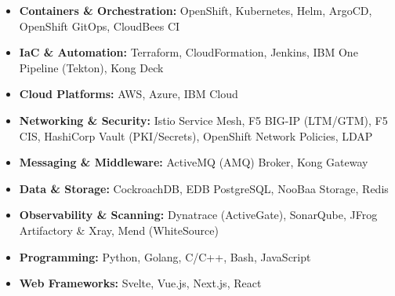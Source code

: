 \begin{itemize}[leftmargin=9pt,label=]
  \item \textbf{Containers \& Orchestration:}
    OpenShift, Kubernetes, Helm, ArgoCD, OpenShift GitOps, CloudBees CI
  \item \textbf{IaC \& Automation:}
    Terraform, CloudFormation, Jenkins, IBM One Pipeline (Tekton), Kong Deck
  \item \textbf{Cloud Platforms:}
    AWS, Azure, IBM Cloud
  \item \textbf{Networking \& Security:}
    Istio Service Mesh, F5 BIG-IP (LTM/GTM), F5 CIS, HashiCorp Vault (PKI/Secrets), OpenShift Network Policies, LDAP
  \item \textbf{Messaging \& Middleware:}
    ActiveMQ (AMQ) Broker, Kong Gateway
  \item \textbf{Data \& Storage:}
    CockroachDB, EDB PostgreSQL, NooBaa Storage, Redis
  \item \textbf{Observability \& Scanning:}
    Dynatrace (ActiveGate), SonarQube, JFrog Artifactory \& Xray, Mend (WhiteSource)
  \item \textbf{Programming:}
    Python, Golang, C/C++, Bash, JavaScript
  \item \textbf{Web Frameworks:}
    Svelte, Vue.js, Next.js, React
\end{itemize}

\vspace{0.1cm} \par
